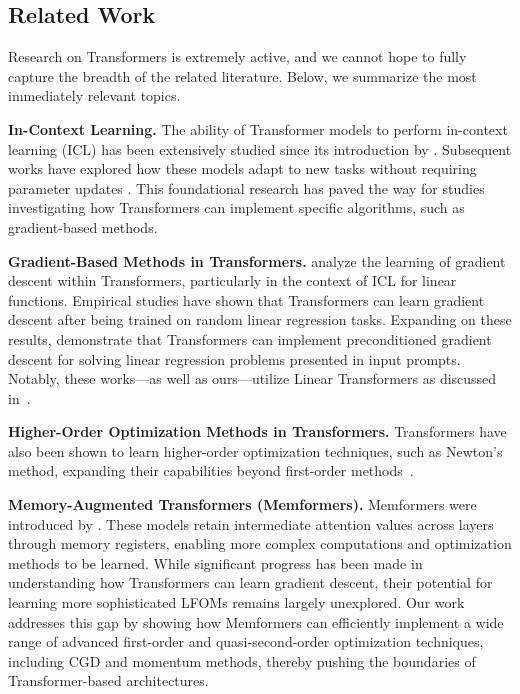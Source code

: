 \documentclass[11pt]{article}
\numberwithin{equation}{section}
\begin{document}
\subsection{Related Work}

Research on Transformers is extremely active, and we cannot hope to fully capture the breadth of the related literature. Below, we summarize the most immediately relevant topics.

\textbf{In-Context Learning.} 
The ability of Transformer models to perform in-context learning (ICL) has been extensively studied since its introduction by \citet{brown2020language}. Subsequent works have explored how these models adapt to new tasks without requiring parameter updates \citep{xie2021explanation, von2023uncovering, hahn2023theory, liu2021makes, lu2021fantastically, wei2022chain, wu2022self}. This foundational research has paved the way for studies investigating how Transformers can implement specific algorithms, such as gradient-based methods.

\noindent\textbf{Gradient-Based Methods in Transformers.} 
\citet{garg2022can} analyze the learning of gradient descent within Transformers, particularly in the context of ICL for linear functions. Empirical studies \citep{garg2022can, akyurek2022learning, von2023transformers} have shown that Transformers can learn gradient descent after being trained on random linear regression tasks. Expanding on these results, \citet{von2023transformers, ahn2024transformers} demonstrate that Transformers can implement preconditioned gradient descent for solving linear regression problems presented in input prompts. Notably, these works—as well as ours—utilize Linear Transformers as discussed in~\citep{schlag2021linear, von2023transformers, ahn2023linear}.

\noindent\textbf{Higher-Order Optimization Methods in Transformers.} 
Transformers have also been shown to learn higher-order optimization techniques, such as Newton's method, expanding their capabilities beyond first-order methods~\citep{fu2023transformers, giannou2024well, vladymyrov2024linear}.

\noindent\textbf{Memory-Augmented Transformers (Memformers).} 
Memformers were introduced by \citet{wu2020Memformer, xu2021transformer}. These models retain intermediate attention values across layers through memory registers, enabling more complex computations and optimization methods to be learned. While significant progress has been made in understanding how Transformers can learn gradient descent, their potential for learning more sophisticated LFOMs remains largely unexplored. Our work addresses this gap by showing how Memformers can efficiently implement a wide range of advanced first-order and quasi-second-order optimization techniques, including CGD and momentum methods, thereby pushing the boundaries of Transformer-based architectures.
\end{document}
